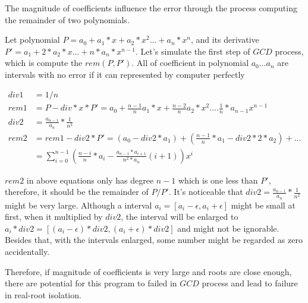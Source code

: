 The magnitude of coefficients influence the error through the process computing
the remainder of two polynomials. 

Let polynomial $P=a_0+a_1*x +
a_2*x^2...+a_n*x^n$, and its derivative
$P'=a_1+2*a_2*x...+n*a_n*x^{n-1}$. Let's simulate the first step of $GCD$
process, which is compute the $rem(P,P')$. All of coefficient in polynomial
$a_0...a_n$ are intervals with no error if it can represented by computer
perfectly

\begin{align*}
  div1 &= 1/n \\ 
  rem1 &= P - div * x * P' =  a_0 + \frac{n-1}{n}a_1*x+ \frac{n-2}{n}a_2*x^2....
\frac{1}{n}*a_{n-1}x^{n-1}\\ 
  div2 &= \frac{a_{n-1}}{a_n} * \frac{1}{n^2} \\ 
  rem2 &= rem1 - div2 * P' = (a_0 - div2*a_1) + (\frac{n-1}{n}*a_1 - div2 *
  2*a_2)+ ... \\
      &= \sum_{i=0}^{n-1} (\frac{n-i}{n}*a_i -
      \frac{a_{n-1}*a_{i+1}}{n^2*a_n}(i+1)) x^i
\end{align*} 

$rem2$ in above equations only has degree $n-1$ which is one less than $P'$,
therefore, it should be the remainder of $P/P'$. It's noticeable that $div2 =
\frac{a_{n-1}}{a_n} * \frac{1}{n^2}$ might be very large. Although a interval $a_i
= [a_i-\epsilon, a_i + \epsilon]$ might be small at first, when it multiplied by $div2$,
the interval 
will be enlarged to $a_i * div2 = [(a_i-\epsilon)*div2, (a_i+\epsilon)*div2]$
and might not be ignorable. Besides that, with the intervals enlarged, some
number might be regarded as zero accidentally. 

Therefore, if magnitude of coefficients is very large and roots are close enough, 
there are potential for this program to failed in $GCD$ process and lead to failure
in real-root isolation.



